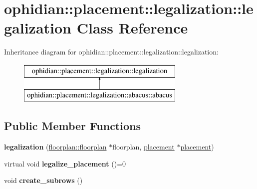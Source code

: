 \hypertarget{classophidian_1_1placement_1_1legalization_1_1legalization}{\section{ophidian\-:\-:placement\-:\-:legalization\-:\-:legalization Class Reference}
\label{classophidian_1_1placement_1_1legalization_1_1legalization}
}
Inheritance diagram for ophidian\-:\-:placement\-:\-:legalization\-:\-:legalization\-:\begin{figure}[H]
\begin{center}
\leavevmode
\includegraphics[height=2.000000cm]{classophidian_1_1placement_1_1legalization_1_1legalization}
\end{center}
\end{figure}
\subsection*{Public Member Functions}
\begin{DoxyCompactItemize}
\item 
\hypertarget{classophidian_1_1placement_1_1legalization_1_1legalization_acaf147a66da8578303cc1d627e922bb0}{{\bfseries legalization} (\hyperlink{classophidian_1_1floorplan_1_1floorplan}{floorplan\-::floorplan} $\ast$floorplan, \hyperlink{classophidian_1_1placement_1_1placement}{placement} $\ast$\hyperlink{classophidian_1_1placement_1_1placement}{placement})}\label{classophidian_1_1placement_1_1legalization_1_1legalization_acaf147a66da8578303cc1d627e922bb0}

\item 
\hypertarget{classophidian_1_1placement_1_1legalization_1_1legalization_a05a362e671fd8fa205d6abb1af72dff0}{virtual void {\bfseries legalize\-\_\-placement} ()=0}\label{classophidian_1_1placement_1_1legalization_1_1legalization_a05a362e671fd8fa205d6abb1af72dff0}

\item 
\hypertarget{classophidian_1_1placement_1_1legalization_1_1legalization_aad4003a5ce5df57882b524dbb8b07008}{void {\bfseries create\-\_\-subrows} ()}\label{classophidian_1_1placement_1_1legalization_1_1legalization_aad4003a5ce5df57882b524dbb8b07008}

\end{DoxyCompactItemize}
